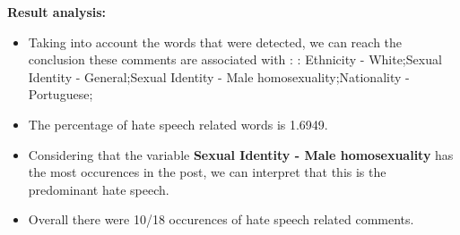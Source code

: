 \documentclass[11pt]{article}
\begin{document}
\textbf{\Large Result analysis:}

\begin{itemize}\item Taking into account the words that were detected, we can reach the conclusion these comments are associated with : : Ethnicity - White;Sexual Identity - General;Sexual Identity - Male homosexuality;Nationality - Portuguese;%

\item The percentage of hate speech related words is 1.6949.

\item Considering that the variable \textbf{Sexual Identity - Male homosexuality} has the most occurences in the post, we can interpret that this is the predominant hate speech.

\item Overall there were 10/18 occurences of hate speech related comments.\end{itemize}
\end{document}
